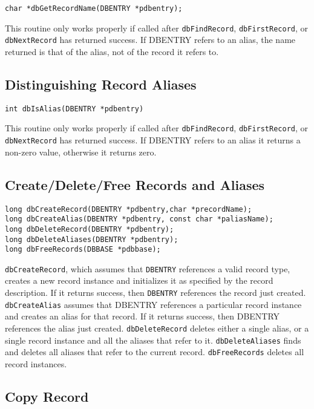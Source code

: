 \begin{verbatim}char *dbGetRecordName(DBENTRY *pdbentry);
\end{verbatim}This routine only works properly if called after \verb|dbFindRecord|, \verb|dbFirstRecord|, or \verb|dbNextRecord| has returned 
success. If DBENTRY refers to an alias, the name returned is that of the alias, not of the record it refers to.

\subsection{Distinguishing Record Aliases}

\begin{verbatim}int dbIsAlias(DBENTRY *pdbentry)
\end{verbatim}This routine only works properly if called after \verb|dbFindRecord|, \verb|dbFirstRecord|, or \verb|dbNextRecord| has returned 
success. If DBENTRY refers to an alias it returns a non-zero value, otherwise it returns zero.

\subsection{Create/Delete/Free Records and Aliases}

\begin{verbatim}long dbCreateRecord(DBENTRY *pdbentry,char *precordName);
long dbCreateAlias(DBENTRY *pdbentry, const char *paliasName);
long dbDeleteRecord(DBENTRY *pdbentry);
long dbDeleteAliases(DBENTRY *pdbentry);
long dbFreeRecords(DBBASE *pdbbase);
\end{verbatim}
\verb|dbCreateRecord|, which assumes that \verb|DBENTRY| references a valid record type, creates a new record instance and 
initializes it as specified by the record description. If it returns success, then \verb|DBENTRY| references the record just created. 
\verb|dbCreateAlias| assumes that DBENTRY references a particular record instance and creates an alias for that record. If 
it returns success, then DBENTRY references the alias just created. \verb|dbDeleteRecord| deletes either a single alias, or a 
single record instance and all the aliases that refer to it. \verb|dbDeleteAliases| finds and deletes all aliases that refer to the 
current record. \verb|dbFreeRecords| deletes all record instances.

\subsection{Copy Record}


